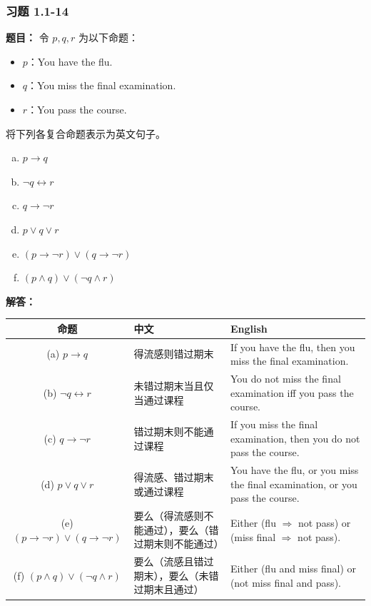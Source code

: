 \documentclass[11pt,UTF8]{article}
\begin{document}
\subsubsection*{习题 1.1-14}
\textbf{题目：} 令 $p, q, r$ 为以下命题：
\begin{itemize}
    \item $p$：You have the flu.
    \item $q$：You miss the final examination.
    \item $r$：You pass the course.
\end{itemize}
将下列各复合命题表示为英文句子。
\begin{enumerate}[a)]
    \item $p \to q$
    \item $\neg q \leftrightarrow r$
    \item $q \to \neg r$
    \item $p \lor q \lor r$
    \item $(p \to \neg r) \lor (q \to \neg r)$
    \item $(p \land q) \lor (\neg q \land r)$
\end{enumerate}

\textbf{解答：}
\begin{center}
\begin{tabular}{c|l|l}
\hline
命题 & 中文 & English \\
\hline
(a) $p \to q$ & 得流感则错过期末 & If you have the flu, then you miss the final examination. \\
(b) $\neg q \leftrightarrow r$ & 未错过期末当且仅当通过课程 & You do not miss the final examination iff you pass the course. \\
(c) $q \to \neg r$ & 错过期末则不能通过课程 & If you miss the final examination, then you do not pass the course. \\
(d) $p \lor q \lor r$ & 得流感、错过期末或通过课程 & You have the flu, or you miss the final examination, or you pass the course. \\
(e) $(p \to \neg r) \lor (q \to \neg r)$ & 要么（得流感则不能通过），要么（错过期末则不能通过） & Either (flu $\Rightarrow$ not pass) or (miss final $\Rightarrow$ not pass). \\
(f) $(p \land q) \lor (\neg q \land r)$ & 要么（流感且错过期末），要么（未错过期末且通过） & Either (flu and miss final) or (not miss final and pass). \\
\hline
\end{tabular}
\end{center}
\end{document}
